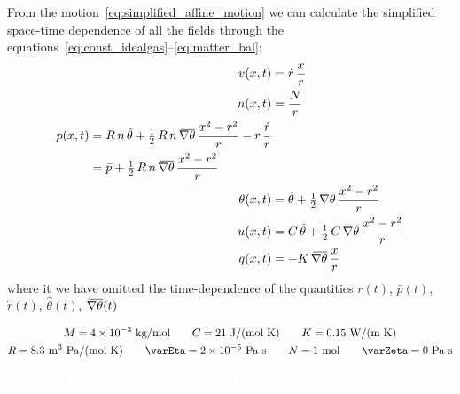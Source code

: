 \documentclass[\ifafour a4paper,12pt,\else a5paper,10pt,\fi%
onecolumn,oneside,article,%
british%
]{memoir}
\theoremstyle{remark}
\theoremstyle{innote}
\renewcommand*{\|}[1][]{\nonscript\,#1\vert\nonscript\;\mathopen{}}
\newcommand*{\widebar}[1]{{\mkern1.5mu\skew{2}\overline{\mkern-1.5mu#1\mkern-1.5mu}\mkern 1.5mu}}
\newcommand*{\yr}{r}
\newcommand*{\yrd}{\dot{\yr}}
\newcommand*{\yno}{N}
\newcommand*{\yt}{\theta}
\newcommand*{\yZ}{\varZeta}
\newcommand*{\yE}{\varEta}
\newcommand*{\yC}{C}
\newcommand*{\ytb}{\hat{\yt}}
\newcommand*{\ypb}{\bar{p}}
\newcommand*{\ygb}{\widebar{\nabla\yt}}
\begin{document}
From the motion~\eqref{eq:simplified_affine_motion} we can calculate the
simplified space-time dependence of all the fields through the
equations~\eqref{eq:const_idealgas}--\eqref{eq:matter_bal}:
\begin{align}
  \label{eq:v_motion}
  v(x,t) &= \yrd\, \frac{x}{\yr}
\\
\label{eq:n_motion}
n(x,t) &= \frac{\yno}{\yr}
\\
\label{eq:p_motion}
  \begin{split}
p(x,t) &= R\, n\, \ytb + \tfrac{1}{2} \,R \, n \, \ygb \,
         \frac{x^{2}-\yr^{2}}{\yr} - \yr \,\frac{\yrd}{\yr}
         \\&=
         \ypb + \tfrac{1}{2} \,R \, n \, \ygb \,
         \frac{x^{2}-\yr^{2}}{\yr} 
       \end{split}
\\
\label{eq:T_motion}
\yt(x,t) &= \ytb + \tfrac{1}{2}\, \ygb\, \frac{x^{2}-\yr^{2}}{\yr}
\\
\label{eq:u_motion}
  u(x,t) &= \yC \, \ytb +
           \tfrac{1}{2}\, \yC \,\ygb \,\frac{x^{2}-\yr^{2}}{\yr}
\\
\label{eq:q_motion}
q(x,t) &= - K \, \ygb \,\frac{x}{\yr}
\end{align}
where it we have omitted the time-dependence of the quantities $\yr(t)$, $\ypb(t)$,
$\yrd(t)$, $\ytb(t)$, $\ygb(t)$


\begin{equation}
  \label{eq:data}
  \begin{gathered}
  M = 4\times 10^{-3}\ \textrm{kg/mol}
  \qquad
  C = 21\ \textrm{J/(mol\ K)}
  \qquad
  K = 0.15\ \textrm{W/(m\ K)}
  \\
  R = 8.3\ \mathrm{m^{3}\ Pa/(mol\ K)}
  \qquad
  \yE = 2\times 10^{-5}\ \textrm{Pa\ s}
  \qquad
  N = 1\ \textrm{mol}
  \qquad
  \yZ = 0\ \textrm{Pa\ s}
\end{gathered}
\end{equation}


\textcolor{white}{If you find this you can claim a postcard from me.}
\fi
\end{document}
